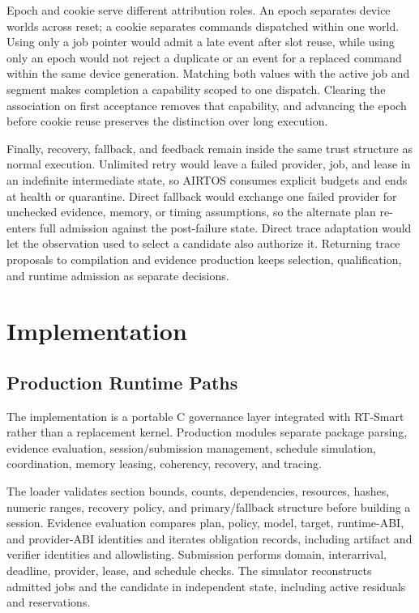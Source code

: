 \documentclass[lettersize,journal]{IEEEtran}
\begin{document}
Epoch and cookie serve different attribution roles. An epoch separates device
worlds across reset; a cookie separates commands dispatched within one world.
Using only a job pointer would admit a late event after slot reuse, while using
only an epoch would not reject a duplicate or an event for a replaced command
within the same device generation. Matching both values with the active job and
segment makes completion a capability scoped to one dispatch. Clearing the
association on first acceptance removes that capability, and advancing the
epoch before cookie reuse preserves the distinction over long execution.

Finally, recovery, fallback, and feedback remain inside the same trust
structure as normal execution. Unlimited retry would leave a failed provider,
job, and lease in an indefinite intermediate state, so AIRTOS consumes explicit
budgets and ends at health or quarantine. Direct fallback would exchange one
failed provider for unchecked evidence, memory, or timing assumptions, so the
alternate plan re-enters full admission against the post-failure state. Direct
trace adaptation would let the observation used to select a candidate also
authorize it. Returning trace proposals to compilation and evidence production
keeps selection, qualification, and runtime admission as separate decisions.

\section{Implementation}
\subsection{Production Runtime Paths}
The implementation is a portable C governance layer integrated with RT-Smart
rather than a replacement kernel. Production modules separate package parsing,
evidence evaluation, session/submission management, schedule simulation,
coordination, memory leasing, coherency, recovery, and tracing.

The loader validates section bounds, counts, dependencies, resources, hashes,
numeric ranges, recovery policy, and primary/fallback structure before building
a session. Evidence evaluation compares plan, policy, model, target,
runtime-ABI, and provider-ABI identities and iterates obligation records,
including artifact and verifier identities and allowlisting. Submission
performs domain, interarrival, deadline, provider, lease, and schedule checks.
The simulator reconstructs admitted jobs and the candidate in independent
state, including active residuals and reservations.
\end{document}
